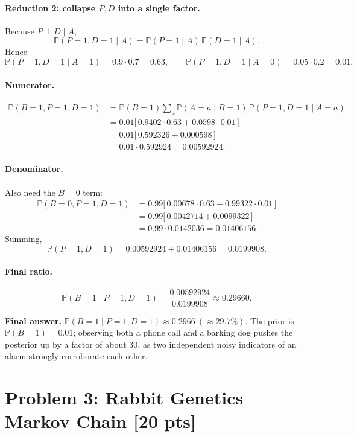\documentclass[12pt]{article}
\newcommand{\Prb}{\mathbb{P}}
\begin{document}
\paragraph{Reduction 2: collapse $P,D$ into a single factor.} Because $P\perp D\mid A$,
\[
  \Prb(P=1,D=1\mid A) = \Prb(P=1\mid A)\,\Prb(D=1\mid A).
\]
Hence
\[
  \Prb(P=1,D=1\mid A=1)=0.9\cdot 0.7=0.63,\qquad
  \Prb(P=1,D=1\mid A=0)=0.05\cdot 0.2=0.01.
\]

\paragraph{Numerator.}
\begin{align*}
  \Prb(B=1,P=1,D=1)
  &= \Prb(B=1)\sum_{a}\Prb(A=a\mid B=1)\,\Prb(P=1,D=1\mid A=a)\\
  &= 0.01\bigl[\,0.9402\cdot 0.63 + 0.0598\cdot 0.01\,\bigr]\\
  &= 0.01\bigl[\,0.592326 + 0.000598\,\bigr]\\
  &= 0.01\cdot 0.592924 = 0.00592924.
\end{align*}

\paragraph{Denominator.} Also need the $B=0$ term:
\begin{align*}
  \Prb(B=0,P=1,D=1)
  &= 0.99\bigl[\,0.00678\cdot 0.63 + 0.99322\cdot 0.01\,\bigr]\\
  &= 0.99\bigl[\,0.0042714 + 0.0099322\,\bigr]\\
  &= 0.99\cdot 0.0142036 = 0.01406156.
\end{align*}
Summing,
\[
  \Prb(P=1,D=1)=0.00592924+0.01406156 = 0.0199908.
\]

\paragraph{Final ratio.}
\[
  \Prb(B=1\mid P=1,D=1)=\frac{0.00592924}{0.0199908}\approx 0.29660.
\]

\textbf{Final answer.} $\Prb(B=1\mid P=1,D=1)\approx 0.2966\ (\approx 29.7\%)$. The prior is $\Prb(B=1)=0.01$; observing both a phone call and a barking dog pushes the posterior up by a factor of about $30$, as two independent noisy indicators of an alarm strongly corroborate each other.

\section*{Problem 3: Rabbit Genetics Markov Chain \hfill [20 pts]}
\end{document}

